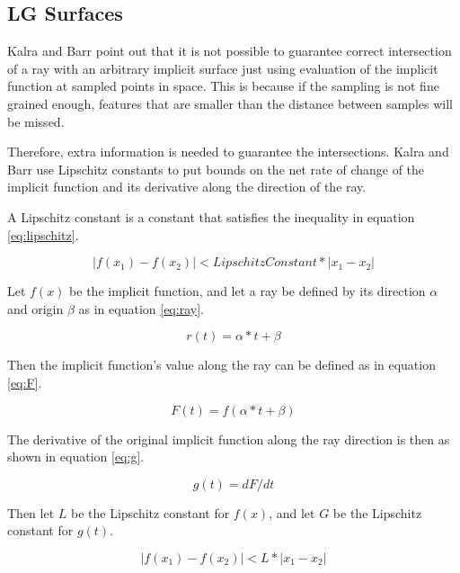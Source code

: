 \documentclass[conference]{acmsiggraph}
\begin{document}
\subsection{LG Surfaces}
\label{sec:LGSurfaces}

Kalra and Barr \cite{KalraBarr1989} point out that it is not possible to
guarantee correct intersection of a ray with an arbitrary implicit surface
just using evaluation of the implicit function at sampled points in space.
This is because if the sampling is not fine grained enough, features that
are smaller than the distance between samples will be missed.

Therefore, extra information is needed to guarantee the intersections.
Kalra and Barr use Lipschitz constants to put bounds
on the net rate of change of the implicit function and its derivative along
the direction of the ray.

A Lipschitz constant is a constant that satisfies the inequality in 
equation \ref{eq:lipschitz}.

\begin{equation}
\label{eq:lipschitz}
|f(x_1) - f(x_2)| < LipschitzConstant * |x_1 - x_2|
\end{equation}

Let $f(x)$ be the implicit function, and let a ray be defined by its 
direction $\alpha$ and origin $\beta$ as in equation \ref{eq:ray}.

\begin{equation}
\label{eq:ray}
r(t) = \alpha * t + \beta
\end{equation}

Then the implicit function's value along the ray can be defined as in
equation \ref{eq:F}.

\begin{equation}
\label{eq:F}
F(t) = f(\alpha * t + \beta)
\end{equation}

The derivative of the original implicit function along the ray direction is 
then as shown in equation \ref{eq:g}.

\begin{equation}
\label{eq:g}
g(t) = dF/dt
\end{equation}

Then let $L$ be the Lipschitz constant for $f(x)$, and let $G$ be the Lipschitz
constant for $g(t)$.  

\begin{equation}
\label{eq:L}
|f(x_1) - f(x_2)| < L * |x_1 - x_2|
\end{equation}
\end{document}
